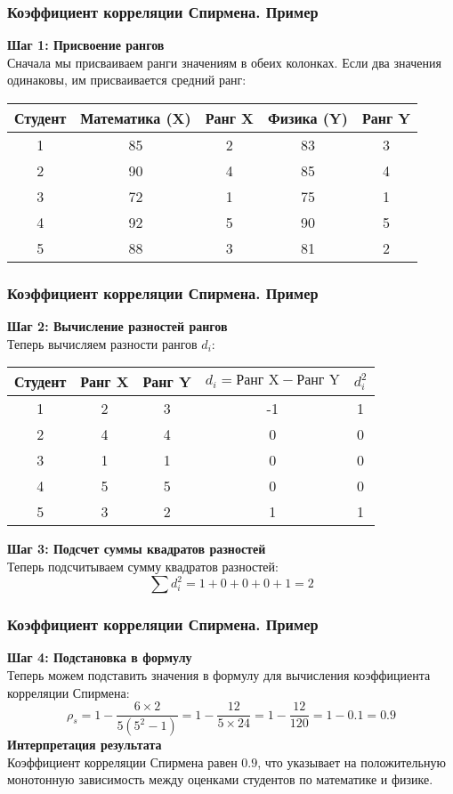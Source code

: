 \documentclass[aspectratio=169]{beamer}
\begin{document}
\begin{frame}
\frametitle{Коэффициент корреляции Спирмена. Пример}
{\bf Шаг 1: Присвоение рангов}\\
Сначала мы присваиваем ранги значениям в обеих колонках. Если два значения одинаковы, им присваивается средний ранг:
\begin{center}
\begin{tabular}{ |c|c|c|c|c| } 
 \hline
Студент & Математика (X) & Ранг X & Физика (Y) & Ранг Y\\ 
 \hline
 1 & 85 & 2  & 83 & 3\\
 \hline
 2 & 90 & 4 & 85 & 4\\
 \hline
 3 & 72 & 1 & 75 & 1\\
 \hline
 4 & 92 & 5 & 90 & 5\\
 \hline
 5 & 88 & 3 & 81 & 2\\
 \hline
\end{tabular}
\end{center}
\end{frame}

\begin{frame}
\frametitle{Коэффициент корреляции Спирмена. Пример}
{\bf Шаг 2: Вычисление разностей рангов}\\
Теперь вычисляем разности рангов \( d_i \):
\begin{center}
\begin{tabular}{ |c|c|c|c|c| } 
 \hline
Студент & Ранг X & Ранг Y & \( d_i = \text{Ранг X} - \text{Ранг Y} \) & \( d_i^2 \)\\ 
 \hline
 1 & 2  & 3 & -1  & 1\\
 \hline
 2 & 4 & 4 & 0 & 0\\
 \hline
 3 & 1 & 1 & 0 & 0\\
 \hline
 4 & 5 & 5 & 0 & 0\\
 \hline
 5 & 3 & 2 & 1 & 1\\
 \hline
\end{tabular}
\end{center}

{\bf Шаг 3: Подсчет суммы квадратов разностей}\\
Теперь подсчитываем сумму квадратов разностей:
\[
\sum d_i^2 = 1 + 0 + 0 + 0 + 1 = 2
\]
\end{frame}

\begin{frame}
\frametitle{Коэффициент корреляции Спирмена. Пример}
{\bf Шаг 4: Подстановка в формулу}\\
Теперь можем подставить значения в формулу для вычисления коэффициента корреляции Спирмена:
\[
\rho_s = 1 - \frac{6 \times 2}{5(5^2 - 1)} = 1 - \frac{12}{5 \times 24} = 1 - \frac{12}{120} = 1 - 0.1 = 0.9
\]
{\bf Интерпретация результата}\\
Коэффициент корреляции Спирмена равен \( 0.9 \), что указывает на положительную монотонную зависимость между оценками студентов по математике и физике.
\end{frame}
\end{document}
